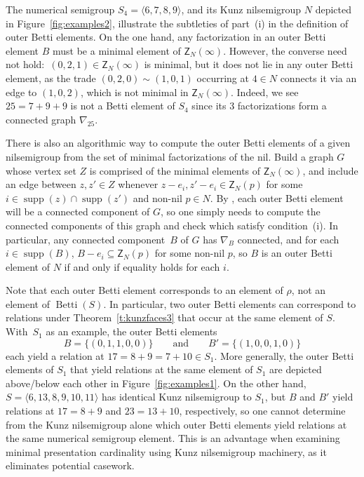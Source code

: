 \documentclass[ALCO]{cedram}
\DeclareMathOperator\Betti{Betti}
\DeclareMathOperator\supp{supp}
\begin{document}
\begin{exam}\label{e:lemma56}
The numerical semigroup $S_4 = \langle 6,7,8,9 \rangle$, and its Kunz nilsemigroup $N$ depicted in Figure~\ref{fig:examples2}, illustrate the subtleties of part~(i) in the definition of outer Betti elements.  On the one hand, any factorization in an outer Betti element $B$ must be a minimal element of $\mathsf Z_N(\infty)$.  However, the converse need not hold:\ $(0,2,1) \in \mathsf Z_N(\infty)$ is minimal, but it does not lie in any outer Betti element, as the trade $(0,2,0) \sim (1,0,1)$ occurring at $4 \in N$ connects it via an edge to $(1,0,2)$, which is not minimal in $\mathsf Z_N(\infty)$.  Indeed, we see $25 = 7 + 9 + 9$ is not a Betti element of $S_4$ since its 3 factorizations form a connected graph $\nabla_{25}$.  

There is also an algorithmic way to compute the outer Betti elements of a given nilsemigroup from the set of minimal factorizations of the nil.  Build a graph $G$ whose vertex set $Z$ is comprised of the minimal elements of $\mathsf Z_N(\infty)$, and include an edge between $z, z' \in Z$ whenever $z - e_i, z' - e_i \in \mathsf Z_N(p)$ for some $i \in \supp(z) \cap \supp(z')$ and non-nil $p \in N$.  By \cite[Lemma~5.6]{kunzfaces3}, each outer Betti element will be a connected component of $G$, so one simply needs to compute the connected components of this graph and check which satisfy condition~(i).  In particular, any connected component~$B$ of $G$ has $\nabla_B$ connected, and for each $i \in \supp(B)$, $B - e_i \subseteq \mathsf Z_N(p)$ for some non-nil $p$, so $B$ is an outer Betti element of $N$ if and only if equality holds for each $i$.  
\end{exam}


\begin{exam}\label{e:outerbettinotbetti}
Note that each outer Betti element corresponds to an element of $\rho$, not an element of $\Betti(S)$.  In particular, two outer Betti elements can correspond to relations under Theorem~\ref{t:kunzfaces3} that occur at the same element of $S$.  With~$S_1$ as an example, the outer Betti elements 
$$
B = \{(0,1,1,0,0)\}
\qquad \text{and} \qquad
B' = \{(1,0,0,1,0)\}
$$
each yield a relation at $17 = 8 + 9 = 7 + 10 \in S_1$.  More generally, the outer Betti elements of $S_1$ that yield relations at the same element of $S_1$ are depicted above/below each other in Figure~\ref{fig:examples1}.  
On the other hand, $S = \langle 6,13,8,9,10,11 \rangle$ has identical Kunz nilsemigroup to $S_1$, but $B$ and $B'$ yield relations at $17 = 8 + 9$ and $23 = 13 + 10$, respectively, so one cannot determine from the Kunz nilsemigroup alone which outer Betti elements yield relations at the same numerical semigroup element.  This is an advantage when examining minimal presentation cardinality using Kunz nilsemigroup machinery, as it eliminates potential casework.  
\end{exam}
\end{document}
